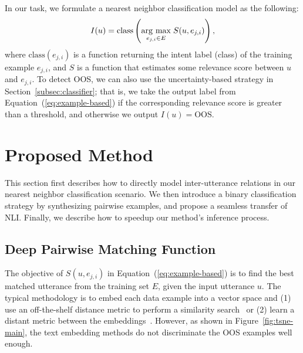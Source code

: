 In our task, we formulate a nearest neighbor classification model as the following:
\begin{equation}
    \label{eq:example-based}
    I(u) = \mathrm{class}\left(\underset{e_{j, i}\in E}{\operatorname{arg}\,\operatorname{max}}\; S(u, e_{j, i}) \right),
\end{equation}
where $\mathrm{class}(e_{j, i})$ is a function returning the intent label (class) of the training example $e_{j, i}$, and $S$ is a function that estimates some relevance score between $u$ and $e_{j, i}$.
To detect OOS, we can also use the uncertainty-based strategy in Section~\ref{subsec:classifier}; that is, we take the output label from Equation~(\ref{eq:example-based}) if the corresponding relevance score is greater than a threshold, and otherwise we output $I(u)=\mathrm{OOS}$.



\section{Proposed Method}
\label{subsec:method}


This section first describes how to directly model inter-utterance relations in our nearest neighbor classification scenario.
We then introduce a binary classification strategy by synthesizing pairwise examples, and propose a seamless transfer of NLI.
Finally, we describe how to speedup our method's inference process.

\subsection{Deep Pairwise Matching Function}
The objective of $S(u, e_{j, i})$ in Equation~(\ref{eq:example-based}) is to find the best matched utterance from the training set $E$, given the input utterance $u$.
The typical methodology is to embed each data example into a vector space and (1) use an off-the-shelf distance metric to perform a similarity search~\citep{knn-classifier} or (2) learn a distant metric between the embeddings~\citep{relation_net}.
However, as shown in Figure~\ref{fig:tsne-main}, the text embedding methods do not discriminate the OOS examples well enough.

